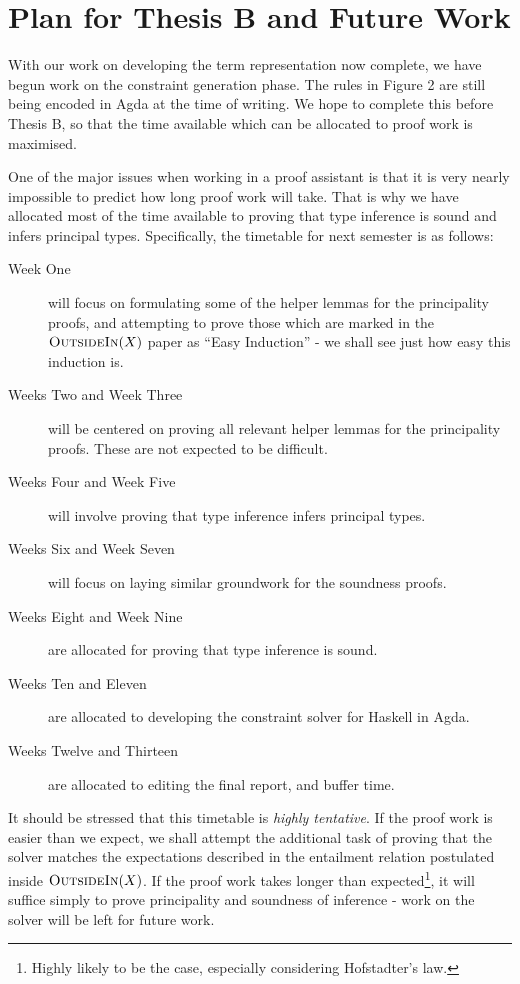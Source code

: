 \documentclass[a4paper]{jfp}
\newcommand{\outsidein}{\textsc{OutsideIn}(X)}
\begin{document}
\section{Plan for Thesis B and Future Work}

With our work on developing the term representation now complete, we have begun work on the constraint generation phase. The rules in Figure 2 are still being encoded in Agda at the time of writing. We hope to complete this before Thesis B, so that the time available which can be allocated to proof work is maximised.

One of the major issues when working in a proof assistant is that it is very nearly impossible to predict how long proof work will take. That is why we have allocated most of the time available to proving that type inference is sound and infers principal types. Specifically, the timetable for next semester is as follows:

\begin{description}
	\item[Week One] will focus on formulating some of the helper lemmas for the principality proofs, and attempting to prove those which are marked in the $\outsidein$ paper as ``Easy Induction'' - we shall see just how easy this induction is.
	\item[Weeks Two and Week Three] will be centered on proving all relevant helper lemmas for the principality proofs. These are not expected to be difficult.
	\item[Weeks Four and Week Five] will involve proving that type inference infers principal types.
	\item[Weeks Six and Week Seven] will focus on laying similar groundwork for the soundness proofs.
	\item[Weeks Eight and Week Nine] are allocated for proving that type inference is sound.
	\item[Weeks Ten and Eleven] are allocated to developing the constraint solver for Haskell in Agda.
	\item[Weeks Twelve and Thirteen] are allocated to editing the final report, and buffer time.
\end{description}

It should be stressed that this timetable is \emph{highly tentative}. If the proof work is easier than we expect, we shall attempt the additional task of proving that the solver matches the expectations described in the entailment relation postulated inside $\outsidein$. If the proof work takes longer than expected\footnote{Highly likely to be the case, especially considering Hofstadter's law.}, it will suffice simply to prove principality and soundness of inference - work on the solver will be left for future work.
\end{document}
